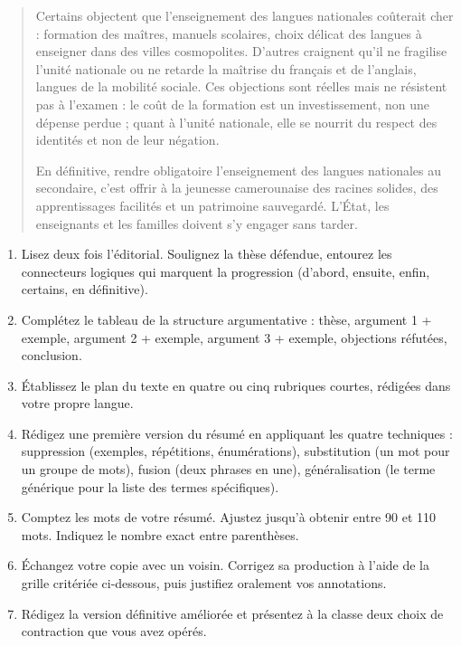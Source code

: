 \documentclass[11pt]{article}
\newcommand{\cle}[1]{{\popxbold\color{popdark}#1}}
\newcounter{popsec}
\newcounter{popsub}
\newcommand{\courssub}[1]{%
  \stepcounter{popsub}%
  \par\vspace{9pt}\noindent{\popxbold\fontsize{11.5}{13}\selectfont\color{popink}{\color{poporange}\thepopsec.\thepopsub}\hspace{6pt}#1}\par\nopagebreak\vspace{4pt}
}
\begin{document}
\begin{quote}
Certains objectent que l'enseignement des langues nationales coûterait cher : formation des maîtres, manuels scolaires, choix délicat des langues à enseigner dans des villes cosmopolites. D'autres craignent qu'il ne fragilise l'unité nationale ou ne retarde la maîtrise du français et de l'anglais, langues de la mobilité sociale. Ces objections sont réelles mais ne résistent pas à l'examen : le coût de la formation est un investissement, non une dépense perdue ; quant à l'unité nationale, elle se nourrit du respect des identités et non de leur négation.

En définitive, rendre obligatoire l'enseignement des langues nationales au secondaire, c'est offrir à la jeunesse camerounaise des racines solides, des apprentissages facilités et un patrimoine sauvegardé. L'État, les enseignants et les familles doivent s'y engager sans tarder.
\end{quote}

\courssub{Consignes}

\begin{enumerate}
\item Lisez deux fois l'éditorial. Soulignez la \cle{thèse} défendue, entourez les connecteurs logiques qui marquent la progression (d'abord, ensuite, enfin, certains, en définitive).
\item Complétez le tableau de la structure argumentative : thèse, argument 1 + exemple, argument 2 + exemple, argument 3 + exemple, objections réfutées, conclusion.
\item Établissez le \cle{plan du texte} en quatre ou cinq rubriques courtes, rédigées dans votre propre langue.
\item Rédigez une première version du résumé en appliquant les quatre techniques : \cle{suppression} (exemples, répétitions, énumérations), \cle{substitution} (un mot pour un groupe de mots), \cle{fusion} (deux phrases en une), \cle{généralisation} (le terme générique pour la liste des termes spécifiques).
\item Comptez les mots de votre résumé. Ajustez jusqu'à obtenir entre 90 et 110 mots. Indiquez le nombre exact entre parenthèses.
\item Échangez votre copie avec un voisin. Corrigez sa production à l'aide de la grille critériée ci-dessous, puis justifiez oralement vos annotations.
\item Rédigez la version définitive améliorée et présentez à la classe deux choix de contraction que vous avez opérés.
\end{enumerate}
\end{document}
